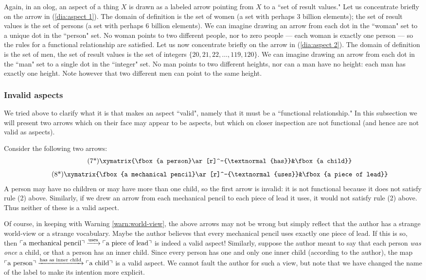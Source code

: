 \documentclass{amsart}
\def\To{\xrightarrow}
\def\To{\xrightarrow}
\newcommand{\LA}[2]{\ar[#1]^-{\tn {#2}}}
\newcommand{\fakebox}[1]{\tn{$\ulcorner$#1$\urcorner$}}
\theoremstyle{remark}
\theoremstyle{definition}
\def\tn{\textnormal}
\begin{document}
Again, in an olog, an aspect of a thing $X$ is drawn as a labeled arrow pointing from $X$ to a ``set of result values."   Let us concentrate briefly on the arrow in (\ref{dia:aspect 1}). The domain of definition is the set of women (a set with perhaps 3 billion elements); the set of result values is the set of persons (a set with perhaps 6 billion elements).  We can imagine drawing an arrow from each dot in the ``woman" set to a unique dot in the ``person" set.  No woman points to two different people, nor to zero people --- each woman is exactly one person --- so the rules for a functional relationship are satisfied. Let us now concentrate briefly on the arrow in (\ref{dia:aspect 2}). The domain of definition is the set of men, the set of result values is the set of integers $\{20,21,22,\ldots,119,120\}$. We can imagine drawing an arrow from each dot in the ``man" set to a single dot in the ``integer" set. No man points to two different heights, nor can a man have no height: each man has exactly one height. Note however that two different men can point to the same height.

\subsubsection{Invalid aspects}

We tried above to clarify what it is that makes an aspect ``valid", namely that it must be a ``functional relationship."  In this subsection we will present two arrows which on their face may appear to be aspects, but which on closer inspection are not functional (and hence are not valid as aspects). 
 
Consider the following two arrows: \begin{align}\tag{7*}\xymatrix{\fbox{a person}\LA{r}{has}&\fbox{a child}}\end{align}\vspace{-.13in}\begin{align}\tag{8*}\xymatrix{\fbox{a mechanical pencil}\LA{r}{uses}&\fbox{a piece of lead}}\end{align}\setcounter{equation}{8}  A person may have no children or may have more than one child, so the first arrow is invalid: it is not functional because it does not satisfy rule (2) above. Similarly, if we drew an arrow from each mechanical pencil to each piece of lead it uses, it would not satisfy rule (2) above. Thus neither of these is a valid aspect.

Of course, in keeping with Warning \ref{warn:world-view}, the above arrows may not be wrong but simply reflect that the author has a strange world-view or a strange vocabulary. Maybe the author believes that every mechanical pencil uses exactly one piece of lead. If this is so, then $\fakebox{a mechanical pencil}\To{\tn{uses}}\fakebox{a piece of lead}$ is indeed a valid aspect!   Similarly, suppose the author meant to say that each person {\em was once} a child, or that a person has an inner child. Since every person has one and only one inner child (according to the author), the map $\fakebox{a person}\To{\tn{has as inner child}}\fakebox{a child}$ is a valid aspect. We cannot fault the author for such a view, but note that we have changed the name of the label to make its intention more explicit.
\end{document}
